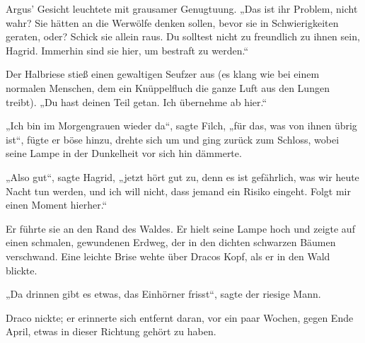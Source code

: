Argus' Gesicht leuchtete mit grausamer Genugtuung. „Das ist ihr Problem, nicht wahr? Sie hätten an die Werwölfe denken sollen, bevor sie in Schwierigkeiten geraten, oder? Schick sie allein raus. Du solltest nicht zu freundlich zu ihnen sein, Hagrid. Immerhin sind sie hier, um bestraft zu werden.“

Der Halbriese stieß einen gewaltigen Seufzer aus (es klang wie bei einem normalen Menschen, dem ein Knüppelfluch die ganze Luft aus den Lungen treibt). „Du hast deinen Teil getan. Ich übernehme ab hier.“

„Ich bin im Morgengrauen wieder da“, sagte Filch, „für das, was von ihnen übrig ist“, fügte er böse hinzu, drehte sich um und ging zurück zum Schloss, wobei seine Lampe in der Dunkelheit vor sich hin dämmerte.

„Also gut“, sagte Hagrid, „jetzt hört gut zu, denn es ist gefährlich, was wir heute Nacht tun werden, und ich will nicht, dass jemand ein Risiko eingeht. Folgt mir einen Moment hierher.“

Er führte sie an den Rand des Waldes. Er hielt seine Lampe hoch und zeigte auf einen schmalen, gewundenen Erdweg, der in den dichten schwarzen Bäumen verschwand. Eine leichte Brise wehte über Dracos Kopf, als er in den Wald blickte.

„Da drinnen gibt es etwas, das Einhörner frisst“, sagte der riesige Mann.

Draco nickte; er erinnerte sich entfernt daran, vor ein paar Wochen, gegen Ende April, etwas in dieser Richtung gehört zu haben.

